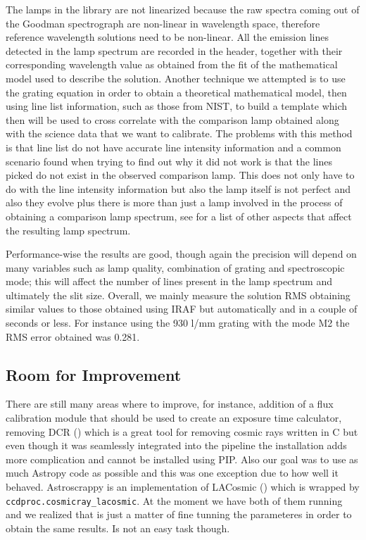 \documentclass[11pt,twoside]{article}
\begin{document}
The lamps in the library are not linearized because the raw spectra coming out of the Goodman spectrograph are non-linear in wavelength space, therefore reference wavelength solutions need to be non-linear. All the emission lines detected in the lamp spectrum are recorded in the header, together with their corresponding wavelength value as obtained from the fit of the mathematical model used to describe the solution. Another technique we attempted is to use the grating equation in order to obtain a theoretical mathematical model, then using line list information, such as those from NIST, to build a template which then will be used to cross correlate with the comparison lamp obtained along with the science data that we want to calibrate. The problems with this method is that line list do not have accurate line intensity information and a common scenario found when trying to find out why it did not work is that the lines picked do not exist in the observed comparison lamp. This does not only have to do with the line intensity information but also the lamp itself is not perfect and also they evolve plus there is more than just a lamp involved in the process of obtaining a comparison lamp spectrum, see \citet{2018A&A...618A.118S} for a list of other aspects that affect the resulting lamp spectrum.

Performance-wise the results are good, though again the precision will depend on many variables such as lamp quality, combination of grating and spectroscopic mode; this will affect the number of lines present in the lamp spectrum and ultimately the slit size. Overall, we mainly measure the solution RMS obtaining similar values to those obtained  using IRAF but automatically and in a couple of seconds or less. For instance  using the 930 l/mm grating with the mode M2 the RMS error obtained was 0.281.

\subsection{Room for Improvement}

There are still many areas where to improve, for instance, addition of a flux calibration module that should be used to create an exposure time calculator, removing DCR (\citet{2004PASP..116..148P}) which is a great tool for removing cosmic rays written in C but even though it was seamlessly integrated into the pipeline the installation adds more complication and cannot be installed using PIP. Also our goal was to use as much Astropy code as possible and this was one exception due to how well it behaved. Astroscrappy is an implementation of LACosmic (\citet{2001PASP..113.1420V}) which is wrapped by \verb=ccdproc.cosmicray_lacosmic=. At the moment we have both of them running and we realized that is just a matter of fine tunning the parameteres in order to obtain the same results. Is not an easy task though. 
\end{document}
